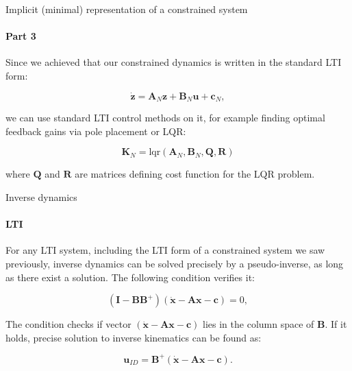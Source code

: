 \documentclass{beamer}
\begin{document}
\begin{frame}{Implicit (minimal) representation of a constrained system}
\framesubtitle{Part 3}
\begin{flushleft}

Since we achieved that our constrained dynamics is written in the standard LTI form:

\begin{equation}
    \dot{\mathbf{z}} = \mathbf{A}_N \mathbf{z} + \mathbf{B}_N \mathbf{u} + \mathbf{c}_N,
\end{equation}

we can use standard LTI control methods on it, for example finding optimal feedback gains via pole placement or LQR:

\begin{equation}
    \mathbf{K}_N = \text{lqr}(\mathbf{A}_N, \mathbf{B}_N, \mathbf{Q}, \mathbf{R})
\end{equation}

where $\mathbf{Q}$ and $\mathbf{R}$ are matrices defining cost function for the LQR problem.

\end{flushleft}
\end{frame}



\begin{frame}{Inverse dynamics}
\framesubtitle{LTI}
\begin{flushleft}

For any LTI system, including the LTI form of a constrained system we saw previously, inverse dynamics can be solved precisely by a pseudo-inverse, as long as there exist a solution. The following condition verifies it:

\begin{equation}
    (\mathbf{I} - \mathbf{B}\mathbf{B}^+)(\dot{\mathbf{x}} - \mathbf{A} \mathbf{x} - \mathbf{c}) = 0,
\end{equation}

The condition checks if vector $(\dot{\mathbf{x}} - \mathbf{A} \mathbf{x} - \mathbf{c})$ lies in the column space of $\mathbf{B}$. If it holds, precise solution to inverse kinematics can be found as:

\begin{equation}
    \mathbf{u}_{ID} = \mathbf{B}^+(\dot{\mathbf{x}} - \mathbf{A} \mathbf{x} - \mathbf{c}).
\end{equation}

\end{flushleft}
\end{frame}
\end{document}

